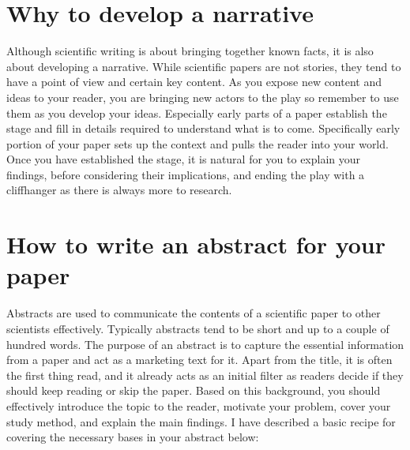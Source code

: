 \section{Why to develop a narrative}

Although scientific writing is about bringing together known facts, it is also about developing a narrative.
While scientific papers are not stories, they tend to have a point of view and certain key content.
As you expose new content and ideas to your reader, you are bringing new actors to the play so remember to use them as you develop your ideas.
Especially early parts of a paper establish the stage and fill in details required to understand what is to come.
Specifically early portion of your paper sets up the context and pulls the reader into your world.
Once you have established the stage, it is natural for you to explain your findings, before considering their implications, and ending the play with a cliffhanger as there is always more to research.



\section{How to write an abstract for your paper}

Abstracts are used to communicate the contents of a scientific paper to other scientists effectively.
Typically abstracts tend to be short and up to a couple of hundred words.
The purpose of an abstract is to capture the essential information from a paper and act as a marketing text for it.
Apart from the title, it is often the first thing read, and it already acts as an initial filter as readers decide if they should keep reading or skip the paper.
Based on this background, you should effectively introduce the topic to the reader, motivate your problem, cover your study method, and explain the main findings.
I have described a basic recipe for covering the necessary bases in your abstract below:

